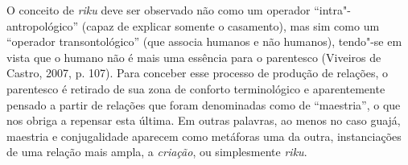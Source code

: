 O conceito de \emph{riku} deve ser observado não como um operador
``intra"-antropológico'' (capaz de explicar somente o casamento), mas sim
como um ``operador transontológico'' (que associa humanos e não humanos),
tendo"-se em vista que o humano não é mais uma essência para o parentesco
(Viveiros de Castro, 2007, p. 107). Para conceber esse processo de
produção de relações, o parentesco é retirado de sua zona de conforto
terminológico e aparentemente pensado a partir de relações que foram
denominadas como de ``maestria'', o que nos obriga a repensar esta última.
Em outras palavras, ao menos no caso guajá, maestria e conjugalidade
aparecem como metáforas uma da outra, instanciações de uma relação mais
ampla, a \emph{criação}, ou simplesmente \emph{riku}.
